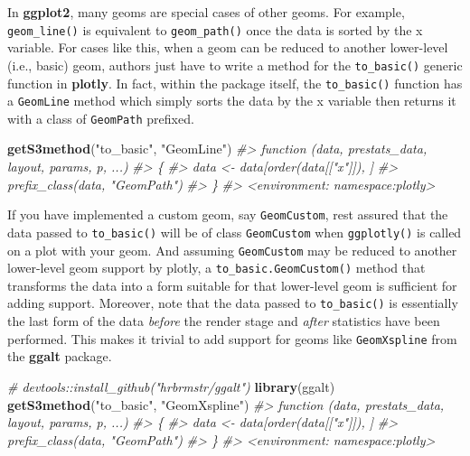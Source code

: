 \documentclass[12pt,]{isuthesis}
\newenvironment{Shaded}{\begin{snugshade}}{\end{snugshade}}
\newcommand{\KeywordTok}[1]{\textcolor[rgb]{0.13,0.29,0.53}{\textbf{{#1}}}}
\newcommand{\StringTok}[1]{\textcolor[rgb]{0.31,0.60,0.02}{{#1}}}
\newcommand{\CommentTok}[1]{\textcolor[rgb]{0.56,0.35,0.01}{\textit{{#1}}}}
\newcommand{\NormalTok}[1]{{#1}}
\begin{document}
In \textbf{ggplot2}, many geoms are special cases of other geoms. For
example, \texttt{geom\_line()} is equivalent to \texttt{geom\_path()}
once the data is sorted by the x variable. For cases like this, when a
geom can be reduced to another lower-level (i.e., basic) geom, authors
just have to write a method for the \texttt{to\_basic()} generic
function in \textbf{plotly}. In fact, within the package itself, the
\texttt{to\_basic()} function has a \texttt{GeomLine} method which
simply sorts the data by the x variable then returns it with a class of
\texttt{GeomPath} prefixed.

\begin{Shaded}
\begin{Highlighting}[]
\KeywordTok{getS3method}\NormalTok{(}\StringTok{"to_basic"}\NormalTok{, }\StringTok{"GeomLine"}\NormalTok{)}
\CommentTok{#> function (data, prestats_data, layout, params, p, ...) }
\CommentTok{#> \{}
\CommentTok{#>     data <- data[order(data[["x"]]), ]}
\CommentTok{#>     prefix_class(data, "GeomPath")}
\CommentTok{#> \}}
\CommentTok{#> <environment: namespace:plotly>}
\end{Highlighting}
\end{Shaded}

If you have implemented a custom geom, say \texttt{GeomCustom}, rest
assured that the data passed to \texttt{to\_basic()} will be of class
\texttt{GeomCustom} when \texttt{ggplotly()} is called on a plot with
your geom. And assuming \texttt{GeomCustom} may be reduced to another
lower-level geom support by plotly, a \texttt{to\_basic.GeomCustom()}
method that transforms the data into a form suitable for that
lower-level geom is sufficient for adding support. Moreover, note that
the data passed to \texttt{to\_basic()} is essentially the last form of
the data \emph{before} the render stage and \emph{after} statistics have
been performed. This makes it trivial to add support for geoms like
\texttt{GeomXspline} from the \textbf{ggalt} package.

\begin{Shaded}
\begin{Highlighting}[]
\CommentTok{# devtools::install_github("hrbrmstr/ggalt")}
\KeywordTok{library}\NormalTok{(ggalt)}
\KeywordTok{getS3method}\NormalTok{(}\StringTok{"to_basic"}\NormalTok{, }\StringTok{"GeomXspline"}\NormalTok{)}
\CommentTok{#> function (data, prestats_data, layout, params, p, ...) }
\CommentTok{#> \{}
\CommentTok{#>     data <- data[order(data[["x"]]), ]}
\CommentTok{#>     prefix_class(data, "GeomPath")}
\CommentTok{#> \}}
\CommentTok{#> <environment: namespace:plotly>}
\end{Highlighting}
\end{Shaded}
\end{document}
